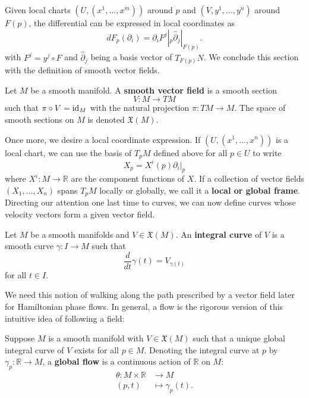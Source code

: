 Given local charts $(U, (x^1, \dots, x^m))$ around $p$ and $(V, y^1, \dots, y^n)$ around $F(p)$, the differential can be expressed in local coordinates as
\[
    dF_p (\partial_i) = \partial_i F^j|_p \hat{\partial}_j|_{F(p)}
.\] with $F^j = y^j \circ F$ and $\hat{\partial}_j$ being a basis vector of $T_{F(p)}N$.
We conclude this section with the definition of smooth vector fields.
\begin{definition}
    Let $M$ be a smooth manifold. A \textbf{smooth vector field} is a smooth section
    \[
    V: M \to TM
    \] such that $\pi \circ V = \operatorname{id}_M$ with the natural projection $\pi: TM \to M$. The space of smooth sections on $M$ is denoted $\mathfrak{X}(M)$. 
\end{definition} 
Once more, we desire a local coordinate expression. If $(U, (x^1, \dots, x^n))$ is a local chart, we can use the basis of $T_pM$ defined above for all $p \in U$ to write
\[
X_p = X^i(p)\partial_i|_p
\] 
where $X^i: M \to \mathbb{R}$ are the component functions of $X$. If a collection of vector fields $(X_1, \dots, X_n)$ spans $T_pM$ locally or globally, we call it a \textbf{local or global frame}.
Directing our attention one last time to curves, we can now define curves whose velocity vectors form a given vector field.
\begin{definition}
    Let $M$ be a smooth manifolds and $V \in \mathfrak{X}(M)$. An \textbf{integral curve} of $V$ is a smooth curve $\gamma: I \to M$ such that
    \[
        \frac{d}{dt}\gamma(t)=V_{\gamma(t)}
    \] for all $t \in I$. 
\end{definition}
We need this notion of walking along the path prescribed by a vector field later for Hamiltonian phase flows. In general, a flow is the rigorous version of this intuitive idea of following a field:
\begin{definition}[Flow]
    Suppose $M$ is a smooth manifold with $V \in \mathfrak{X}(M)$ such that a unique global integral curve of $V$ exists for all $p \in M$. Denoting the integral curve at $p$ by $\gamma_p: \mathbb{R} \to M$, a \textbf{global flow} is a continuous action of $\mathbb{R}$ on $M$:
    \begin{align*}
        \theta: M \times \mathbb{R} &\to M\\
        (p, t) &\mapsto \gamma_p(t).
    \end{align*}
\end{definition}

